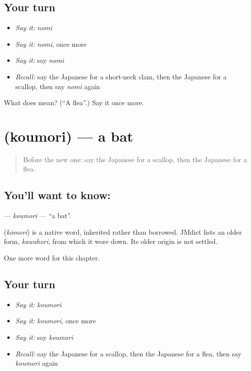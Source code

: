 \subsection*{Your turn}
\begin{itemize}
\raggedright
  \item \emph{Say it:} \emph{nomi}
  \item \emph{Say it:} \emph{nomi}, once more
  \item \emph{Say it:} say \emph{nomi}
  \item \emph{Recall:} say the Japanese for a short-neck clam, then the Japanese for a scallop, then say \emph{nomi} again
\end{itemize}

\begin{tcolorbox}[breakable,colback=teal!4,colframe=teal!35!black,title={Before you move on}]
What does  mean? (\textquotedblleft{}A flea\textquotedblright{}.) Say it once more.
\end{tcolorbox}
\section[\texorpdfstring{\ja{こうもり} (koumori)}{こうもり (koumori)}]{ (koumori) — a bat}

\label{lesson:JA-C117-koumori}



\begin{quote}
Before the new one: say the Japanese for a scallop, then the Japanese for a flea.
\end{quote}

\subsection*{You'll want to know: }
\textbf{} — \emph{koumori} — \textquotedblleft{}a bat\textquotedblright{}.

\begin{cousinweb}
\textbf{} (\emph{kōmori}) is a native word, inherited rather than borrowed. JMdict lists an older form, \emph{kawahori}, from which it wore down. Its older origin is not settled.
\end{cousinweb}

\begin{grammarlens}[title={What you've built}]
One more word for this chapter.
\end{grammarlens}

\subsection*{Your turn}
\begin{itemize}
\raggedright
  \item \emph{Say it:} \emph{koumori}
  \item \emph{Say it:} \emph{koumori}, once more
  \item \emph{Say it:} say \emph{koumori}
  \item \emph{Recall:} say the Japanese for a scallop, then the Japanese for a flea, then say \emph{koumori} again
\end{itemize}

